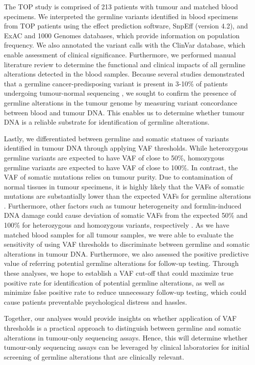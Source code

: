 The TOP study is comprised of 213 patients with tumour and matched blood specimens. We interpreted the germline variants identified in blood specimens from TOP patients using the effect prediction software, SnpEff (version 4.2), and ExAC and 1000 Genomes databases, which provide information on population frequency. We also annotated the variant calls with the ClinVar database, which enable assessment of clinical significance. Furthermore, we performed manual literature review to determine the functional and clinical impacts of all germline alterations detected in the blood samples. Because several studies demonstrated that a germline cancer-predisposing variant is present in 3-10\% of patients undergoing tumour-normal sequencing \cite{Raymond2016,Meric-Bernstam2016,Schrader2015,Jones2015a}, we sought to confirm the presence of germline alterations in the tumour genome by measuring variant concordance between blood and tumour DNA. This enables us to determine whether tumour DNA is a reliable substrate for identification of germline alterations.

Lastly, we differentiated between germline and somatic statuses of variants identified in tumour DNA through applying VAF thresholds. While heterozygous germline variants are expected to have VAF of close to 50\%, homozygous germline variants are expected to have VAF of close to 100\%. In contrast, the VAF of somatic mutations relies on tumour purity. Due to contamination of normal tissues in tumour specimens, it is highly likely that the VAFs of somatic mutations are substantially lower than the expected VAFs for germline alterations \cite{}. Furthermore, other factors such as tumour heterogeneity and formlin-induced DNA damage could cause deviation of somatic VAFs from the expected 50\% and 100\% for heterozygous and homozygous variants, respectively \cite{}. As we have matched blood samples for all tumour samples, we were able to evaluate the sensitivity of using VAF thresholds to discriminate between germline and somatic alterations in tumour DNA. Furthermore, we also assessed the positive predictive value of referring potential germline alterations for follow-up testing. Through these analyses, we hope to establish a VAF cut-off that could maximize true positive rate for identification of potential germline alterations, as well as minimize false positive rate to reduce unnecessary follow-up testing, which could cause patients preventable psychological distress and hassles.

Together, our analyses would provide insights on whether application of VAF thresholds is a practical approach to distinguish between germline and somatic alterations in tumour-only sequencing assays. Hence, this will determine whether tumour-only sequencing assays can be leveraged by clinical laboratories for initial screening of germline alterations that are clinically relevant.


